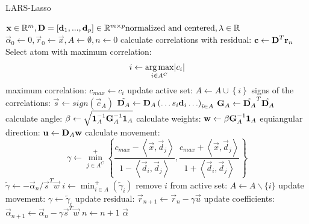 \begin{algorithm}[h]
\caption{LARS-Lasso}
\label{alg:lars}
\begin{algorithmic}[1]
\REQUIRE $\boldsymbol{\mathrm{x}} \in \mathbb{R}^m, \boldsymbol{\mathrm{D}} =[\boldsymbol{\mathrm{d}}_1,...,\boldsymbol{\mathrm{d}}_p] \in
\mathbb{R}^{m\times p} \text{normalized and centered},\lambda \in \mathbb{R}$
\STATE $\vec{\alpha}_0 \gets 0, \vec{r}_0 \gets \vec{x}, A \gets \emptyset, n
\gets 0$
\STATE calculate correlations with residual: $\boldsymbol{\mathrm{c}} \gets
\boldsymbol{\mathrm{D}}^T\boldsymbol{\mathrm{r}}_n$
\STATE Select atom with maximum correlation: 
\begin{equation*}
i \gets \argmax_{i \in A^C} \lvert c_i  \rvert %
\end{equation*}
\STATE maximum correlation: $c_{max} \gets c_i $ %
\STATE update active set: $A \gets A \cup \left\{i\right\} $
\STATE{}
\STATE signs of the correlations: $\vec{s} \gets  sign\left(\vec{c}_A\right)$
\STATE $\tilde{\boldsymbol{\mathrm{D}}_A} \gets \boldsymbol{\mathrm{D}}_A\left(\ldots s_i\boldsymbol{\mathrm{d}}_i
\ldots\right)_{i\in A}$
\STATE $\boldsymbol{\mathrm{G}}_A \gets \tilde{\boldsymbol{\mathrm{D}}_A}^T\tilde{\boldsymbol{\mathrm{D}}_A}$
\STATE calculate angle: $\beta \gets \sqrt{ \boldsymbol{\mathrm{1}}_A^{-1} \boldsymbol{\mathrm{G}}_A^{-1}
\boldsymbol{\mathrm{1}}_A}$
\STATE calculate weights: $\boldsymbol{\mathrm{w}} \gets \beta\boldsymbol{\mathrm{G}}_A^{-1}\boldsymbol{\mathrm{1}}_A$
\STATE equiangular direction: $\boldsymbol{\mathrm{u}} \gets \boldsymbol{\mathrm{D}}_A\boldsymbol{\mathrm{w}}$
\STATE calculate movement:
\begin{equation*}
\gamma \gets \min_{j\in A^C}^{+} \left\lbrace \frac{c_{max}-\left<
\vec{x},\vec{d}_j \right> }{1-\left< \vec{d}_i,\vec{d}_j \right> },
\frac{c_{max}+\left< \vec{x},\vec{d}_j \right>}{1+\left< \vec{d}_i,\vec{d}_j
\right> } \right\rbrace
\end{equation*}
\STATE $ \tilde{\gamma} \gets -\vec{\alpha}_n/\vec{s}^T\vec{w}  $
\STATE $ i \gets \min_{i\in A}^{+} \left( \tilde{\gamma}_i \right) $
\STATE remove $i$ from active  set: $ A \gets A \backslash \{i\} $
\STATE update movement: $ \gamma \gets \tilde{\gamma}_i $  
\ENDIF
\ENDIF
\STATE update residual: $ \vec{r}_{n+1} \gets \vec{r}_{n} - \gamma \vec{u}$
\STATE update coefficients: $ \vec{\alpha}_{n+1} \gets \vec{\alpha}_n - \gamma
\vec{s}^T\vec{w} $
\STATE $n \gets n + 1$ 
\ENDWHILE
\RETURN $\vec{\alpha}$
\end{algorithmic}
\end{algorithm}

